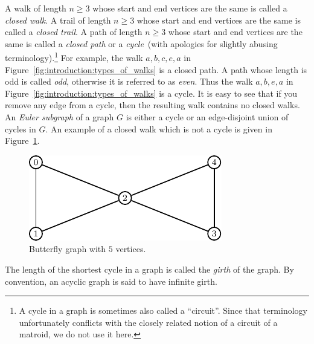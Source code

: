 A walk of length $n \geq 3$ whose start and end vertices
are the same is called a \emph{closed walk}.
A trail of length $n \geq 3$ whose start and end vertices
are the same is called a \emph{closed trail}.
A path of length $n \geq 3$ whose start and end vertices
are the same is called a \emph{closed path}
or a \emph{cycle}~(with apologies for slightly abusing
terminology).\footnote{
  A cycle in a graph is sometimes also called a
  ``circuit''. Since that terminology unfortunately
  conflicts with the closely related notion of a circuit of a matroid,
  we do not use it here.
}
For example, the walk $a, b, c, e, a$ in
Figure~\ref{fig:introduction:types_of_walks} is a closed path. A path
whose length is odd is called \emph{odd}, otherwise it
is referred to as \emph{even}. Thus the walk
$a, b, e, a$ in Figure~\ref{fig:introduction:types_of_walks} is a
cycle. It is easy to see that if you remove any edge from a cycle,
then the resulting walk contains no closed walks. An
\emph{Euler subgraph} of a graph $G$ is either a
cycle or an edge-disjoint union of cycles in $G$. An example of a
closed walk which is not a cycle is given in
Figure~\ref{fig:introduction:butterfly_graph}.

\begin{figure}[!htbp]
\centering
{}
\includegraphics{image/introduction/butterfly-graph}
\caption{Butterfly graph with $5$ vertices.}
\label{fig:introduction:butterfly_graph}
\end{figure}

The length of the shortest cycle in a graph is called the
\emph{girth} of the graph. By convention, an acyclic
graph is said to have infinite girth.

